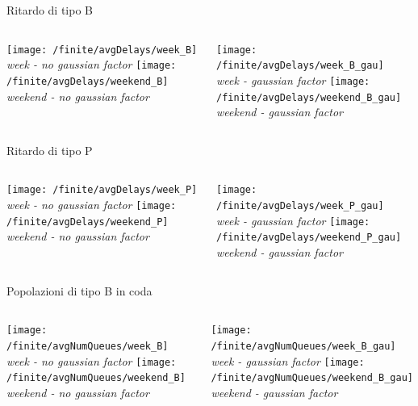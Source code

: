 \documentclass[xcolor=table]{beamer}
\begin{document}
\begin{frame}{Ritardo di tipo B}
\begin{columns}
\centering
\texttt{[image: /finite/avgDelays/week\_B]}\\
\textit{week - no gaussian factor}
\texttt{[image: /finite/avgDelays/weekend\_B]}\\
\textit{weekend - no gaussian factor}

\centering
\texttt{[image: /finite/avgDelays/week\_B\_gau]}\\
\textit{week - gaussian factor}
\texttt{[image: /finite/avgDelays/weekend\_B\_gau]}\\
\textit{weekend - gaussian factor}
\end{columns}
\end{frame}

\begin{frame}{Ritardo di tipo P}
\begin{columns}
\centering
\texttt{[image: /finite/avgDelays/week\_P]}\\
\textit{week - no gaussian factor}
\texttt{[image: /finite/avgDelays/weekend\_P]}\\
\textit{weekend - no gaussian factor}

\centering
\texttt{[image: /finite/avgDelays/week\_P\_gau]}\\
\textit{week - gaussian factor}
\texttt{[image: /finite/avgDelays/weekend\_P\_gau]}\\
\textit{weekend - gaussian factor}
\end{columns}
\end{frame}


\begin{frame}{Popolazioni di tipo B in coda}
\begin{columns}
\centering
\texttt{[image: /finite/avgNumQueues/week\_B]}\\
\textit{week - no gaussian factor}
\texttt{[image: /finite/avgNumQueues/weekend\_B]}\\
\textit{weekend - no gaussian factor}

\centering
\texttt{[image: /finite/avgNumQueues/week\_B\_gau]}\\
\textit{week - gaussian factor}
\texttt{[image: /finite/avgNumQueues/weekend\_B\_gau]}\\
\textit{weekend - gaussian factor}
\end{columns}
\end{frame}
\end{document}
